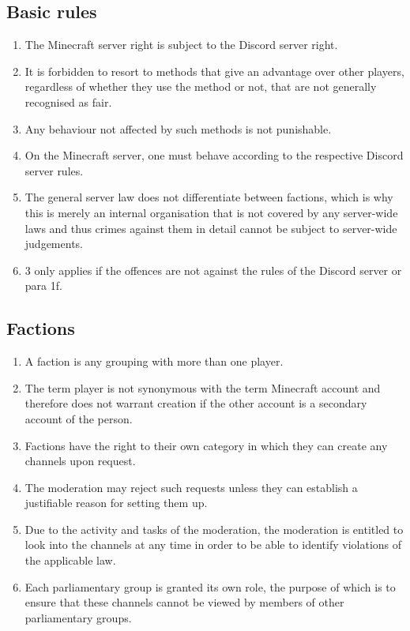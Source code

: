 \documentclass{article}
\begin{document}
\subsection{Basic rules}
\begin{enumerate}[(1)]
	\item The Minecraft server right is subject to the Discord server right.
	\item It is forbidden to resort to methods that give an advantage over other players, regardless of whether they use the method or not, that are not generally recognised as fair.
	\item Any behaviour not affected by such methods is not punishable.
	\item On the Minecraft server, one must behave according to the respective Discord server rules.
	\item The general server law does not differentiate between factions, which is why this is merely an internal organisation that is not covered by any server-wide laws and thus crimes against them in detail cannot be subject to server-wide judgements.
	\item 3 only applies if the offences are not against the rules of the Discord server or para 1f.
\end{enumerate}

\subsection{Factions}
\begin{enumerate}[(1)]
    \item A faction is any grouping with more than one player.
	\item The term player is not synonymous with the term Minecraft account and therefore does not warrant creation if the other account is a secondary account of the person.
	\item Factions have the right to their own category in which they can create any channels upon request.
	\item The moderation may reject such requests unless they can establish a justifiable reason for setting them up.
	\item Due to the activity and tasks of the moderation, the moderation is entitled to look into the channels at any time in order to be able to identify violations of the applicable law.
	\item Each parliamentary group is granted its own role, the purpose of which is to ensure that these channels cannot be viewed by members of other parliamentary groups.
\end{enumerate}
\end{document}

